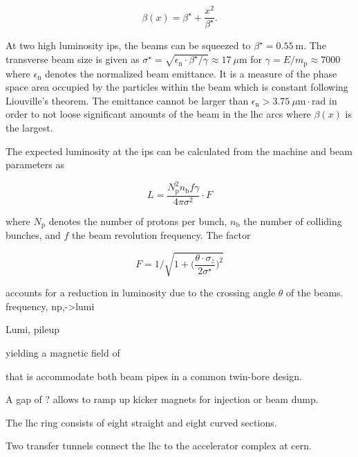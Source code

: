 \begin{equation}
\beta(x)=\beta^\star+\frac{x^2}{\beta^\star}.
\end{equation}

At two high luminosity \glspl{ip}, the beams can be squeezed to $\beta^\star=0.55~\mathrm{m}$. The transverse beam size is given as $\sigma^{\star}=\sqrt{\epsilon_\mathrm{n}\cdot\beta^\star/\gamma}\approx17~{\mu\mathrm{m}}$ for $\gamma=E/m_\mathrm{p}\approx7000$ where $\epsilon_\mathrm{n}$ denotes the normalized beam emittance. It is a measure of the phase space area occupied by the particles within the beam which is constant following Liouville's theorem. The emittance cannot be larger than $\epsilon_\mathrm{n}>3.75~\mu\mathrm{m}\cdot\mathrm{rad}$ in order to not loose significant amounts of the beam in the \gls{lhc} arcs where $\beta(x)$ is the largest.

The expected luminosity at the \glspl{ip} can be calculated from the machine and beam parameters as

\begin{equation}
L=\frac{N_\mathrm{p}^{2}n_\mathrm{b}f\gamma}{4\pi\sigma^{2}}\cdot F
\end{equation}

where $N_\mathrm{p}$ denotes the number of protons per bunch, $n_\mathrm{b}$ the number of colliding bunches, and $f$ the beam revolution frequency. The factor 

\begin{equation}
F=1\Bigg/\sqrt{1+\Big(\frac{\theta\cdot\sigma_{z}}{2\sigma^\star}\Big)^2}
\end{equation}

accounts for a reduction in luminosity due to the crossing angle $\theta$ of the beams. frequency, np,->lumi

Lumi, pileup





 yielding a magnetic field of 

 that is accommodate both beam pipes in a common twin-bore design.



A gap of ? allows to ramp up kicker magnets for injection or beam dump.




The \gls{lhc} ring consists of eight straight and eight curved sections. 

Two transfer tunnels connect the \gls{lhc} to the accelerator complex at \gls{cern}.

